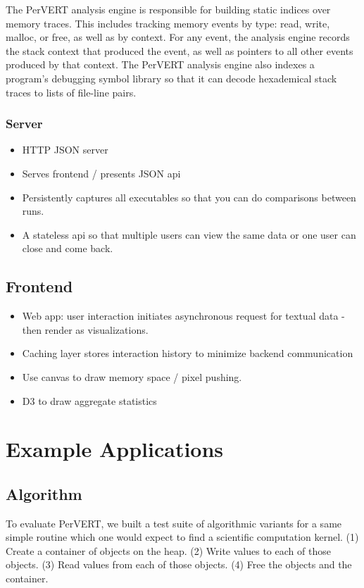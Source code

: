 \documentclass[annual]{acmsiggraph}
\begin{document}
      The PerVERT analysis engine is responsible for building static indices over memory traces.
      This includes tracking memory events by type: read, write, malloc, or free,
        as well as by context.
      For any event, the analysis engine records the stack context that produced the event, 
        as well as pointers to all other events produced by that context.       
      The PerVERT analysis engine also indexes a program's debugging symbol library so that it can decode
        hexademical stack traces to lists of file-line pairs.


    \subsubsection{Server}
      \begin{itemize}
        \item HTTP JSON server
        \item Serves frontend / presents JSON api
        \item Persistently captures all executables so that you can do comparisons between runs.
        \item A stateless api so that multiple users can view the same data or one user can close and come back.
      \end{itemize}

  \subsection{Frontend}
    \begin{itemize}
      \item Web app: user interaction initiates asynchronous request for textual data - then render as visualizations.
      \item Caching layer stores interaction history to minimize backend communication
      \item Use canvas to draw memory space / pixel pushing.
      \item D3 to draw aggregate statistics
    \end{itemize}

\section {Example Applications}

  \subsection{Algorithm}
    To evaluate PerVERT, we built a test suite of algorithmic variants for a same simple routine
      which one would expect to find a scientific computation kernel.
    (1) Create a container of objects on the heap.
    (2) Write values to each of those objects.
    (3) Read values from each of those objects.
    (4) Free the objects and the container.
\end{document}
